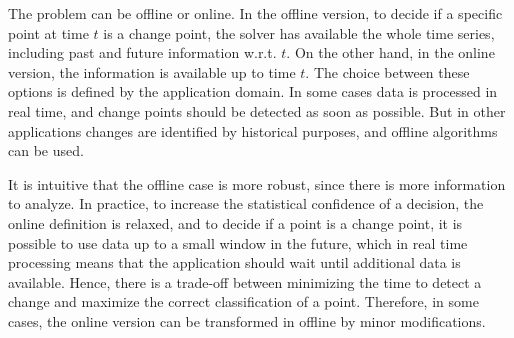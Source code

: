 The problem can be offline or online. In the offline version, to decide if a
specific point at time $t$ is a change point, the solver has available the
whole time series, including past and future information w.r.t. $t$. On the
other hand, in the online version, the information is available up to time $t$.
The choice between these options is defined by the application domain. In some
cases data is processed in real time, and change points should be detected as
soon as possible. But in other applications changes are identified by historical
purposes, and offline algorithms can be used.

It is intuitive that the offline case is more robust, since there is more
information to analyze. In practice, to increase the statistical confidence of
a decision, the online definition is relaxed, and to decide if a point
is a change point, it is possible to use data up to a small window in the future,
which in real time processing means that the application should wait until
additional data is available. Hence, there is a trade-off between minimizing
the time to detect a change and maximize the correct classification of a point.
Therefore, in some cases, the online version can be transformed in offline
by minor modifications.

